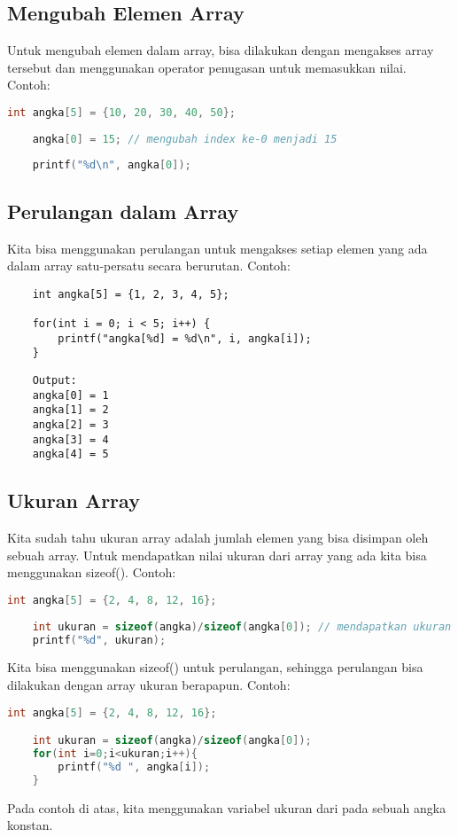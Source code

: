 \subsection{Mengubah Elemen Array}

Untuk mengubah elemen dalam array, bisa dilakukan dengan mengakses array tersebut dan menggunakan operator penugasan untuk memasukkan nilai.
Contoh:
\begin{lstlisting}[language=c]
	int angka[5] = {10, 20, 30, 40, 50};
	
	angka[0] = 15; // mengubah index ke-0 menjadi 15
	
	printf("%d\n", angka[0]);
\end{lstlisting}

\subsection{Perulangan dalam Array}
Kita bisa menggunakan perulangan untuk mengakses setiap elemen yang ada dalam array satu-persatu secara berurutan.
Contoh:
\begin{lstlisting}
	int angka[5] = {1, 2, 3, 4, 5};

	for(int i = 0; i < 5; i++) {
		printf("angka[%d] = %d\n", i, angka[i]);
	}
\end{lstlisting}
\begin{verbatim}
	Output:
	angka[0] = 1
	angka[1] = 2
	angka[2] = 3
	angka[3] = 4
	angka[4] = 5
\end{verbatim}

\subsection{Ukuran Array}

Kita sudah tahu ukuran array adalah jumlah elemen yang bisa disimpan oleh sebuah array.
Untuk mendapatkan nilai ukuran dari array yang ada kita bisa menggunakan sizeof().
Contoh:
\begin{lstlisting}[language=c]
	int angka[5] = {2, 4, 8, 12, 16};
	
	int ukuran = sizeof(angka)/sizeof(angka[0]); // mendapatkan ukuran array angka
	printf("%d", ukuran);
\end{lstlisting}
Kita bisa menggunakan sizeof() untuk perulangan, sehingga perulangan bisa dilakukan dengan array ukuran berapapun.
Contoh:
\begin{lstlisting}[language=c]
	int angka[5] = {2, 4, 8, 12, 16};

	int ukuran = sizeof(angka)/sizeof(angka[0]);
	for(int i=0;i<ukuran;i++){
		printf("%d ", angka[i]);
	}
\end{lstlisting}
Pada contoh di atas, kita menggunakan variabel ukuran dari pada sebuah angka konstan.

